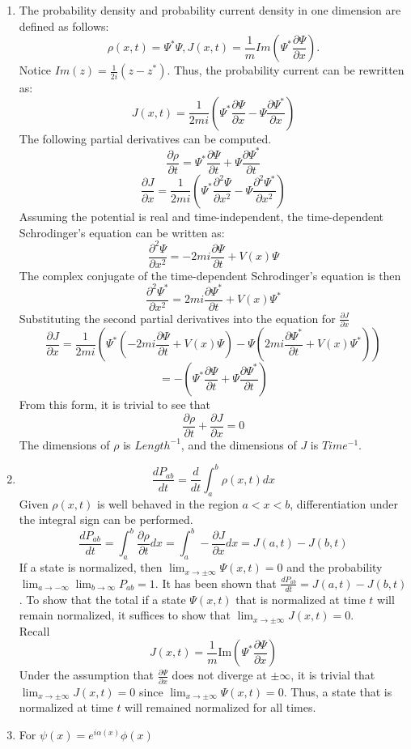 \begin{sol}
\begin{enumerate}[label=\textbf{(\alph*)}]
    \item
    The probability density and probability current density in one dimension are defined as follows:
    $$\rho(x,t)=\Psi^*\Psi,J(x,t)=\frac{1}{m}Im\left(\Psi^*\frac{\partial\Psi}{\partial x}\right).$$
    Notice $Im(z)=\frac{1}{2i}(z-z^*)$. Thus, the probability current can be rewritten as:
    $$J(x,t)=\frac{1}{2mi}\left(\Psi^*\frac{\partial\Psi}{\partial x}-\Psi\frac{\partial\Psi^*}{\partial x}\right)$$
    The following partial derivatives can be computed.
    $$\frac{\partial\rho}{\partial t}=\Psi^*\frac{\partial\Psi}{\partial t}+\Psi\frac{\partial\Psi^*}{\partial t}$$ $$\frac{\partial J}{\partial x}=\frac{1}{2mi}\left(\Psi^*\frac{\partial^2\Psi}{\partial x^2}-\Psi\frac{\partial^2\Psi^*}{\partial x^2}\right)$$ 
    Assuming the potential is real and time-independent, the time-dependent Schrodinger's equation can be written as:
    $$\frac{\partial^2\Psi}{\partial x^2}=-2mi\frac{\partial\Psi}{\partial t}+V(x)\Psi$$ 
    The complex conjugate of the time-dependent Schrodinger's equation is then
     $$\frac{\partial^2\Psi^*}{\partial x^2}=2mi\frac{\partial\Psi^*}{\partial t}+V(x)\Psi^*$$
    Substituting the second partial derivatives into the equation for $\frac{\partial J}{\partial x}$
    $$\frac{\partial J}{\partial x}=\frac{1}{2mi}\left(\Psi^*\left(-2mi\frac{\partial\Psi}{\partial t}+V(x)\Psi\right)-\Psi\left(2mi\frac{\partial\Psi^*}{\partial t}+V(x)\Psi^*\right)\right)$$
    $$=-\left(\Psi^*\frac{\partial\Psi}{\partial t}+\Psi\frac{\partial\Psi^*}{\partial t}\right)$$
    From this form, it is trivial to see that
    $$\frac{\partial\rho}{\partial t}+\frac{\partial J}{\partial x}=0$$ 
    The dimensions of $\rho$ is $Length^{-1}$, and the dimensions of $J$ is $Time^{-1}$.
   \item
   $$\frac{dP_{ab}}{dt}=\frac{d}{dt}\int_{a}^{b}\rho(x,t)dx$$ 
   Given $\rho(x,t)$ is well behaved in the region $a<x<b$, differentiation under the integral sign can be performed.
   $$\frac{dP_{ab}}{dt}=\int_{a}^{b}\frac{\partial\rho}{\partial t}dx=
   \int_{a}^{b}-\frac{\partial J}{\partial x}dx=J(a,t)-J(b,t)$$ If a state is normalized, then $\lim_{x\to\pm\infty}\Psi(x,t)=0$ and the probability $\lim_{a\to-\infty}\lim_{b\to\infty}P_{ab}=1$. It has been shown that $\frac{dP_{ab}}{dt}=J(a,t)-J(b,t)$. To show that the total if a state $\Psi(x,t)$ that is normalized at time $t$ will remain normalized, it suffices to show that $\lim_{x\to\pm\infty}J(x,t)=0$. \\
   Recall $$J(x,t)=\frac{1}{m}\text{Im}\left(\Psi^*\frac{\partial\Psi}{\partial x}\right)$$
   Under the assumption that $\frac{\partial\Psi}{\partial x}$ does not diverge at $\pm\infty$, it is trivial that $\lim_{x\to\pm\infty}J(x,t)=0$ since $\lim_{x\to\pm\infty}\Psi(x,t)=0$. Thus, a state that is normalized at time $t$ will remained normalized for all times.
   \item 
   For $\psi(x)=e^{i\alpha(x)}\phi(x)$
  

\end{enumerate}
\end{sol}
